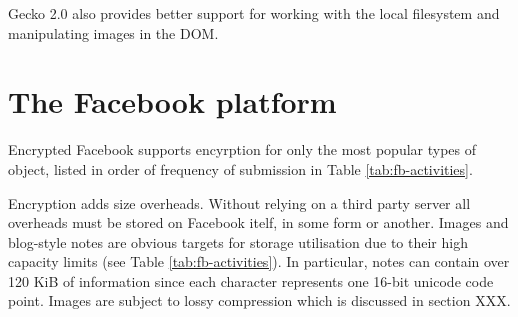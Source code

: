 Gecko 2.0 also provides better support for working with the local filesystem and manipulating images in the \ac{DOM}.


\section{The Facebook platform}


Encrypted Facebook supports encyrption for only the most popular types of object, listed in order of frequency of submission in Table \ref{tab:fb-activities}.

Encryption adds size overheads. Without relying on a third party server all overheads must be stored on Facebook itelf, in some form or another. Images and blog-style notes are obvious targets for storage utilisation due to their high capacity limits (see Table \ref{tab:fb-activities}). In particular, notes can contain over 120 KiB of information since each character represents one 16-bit unicode code point. Images are subject to lossy compression which is discussed in section XXX.

